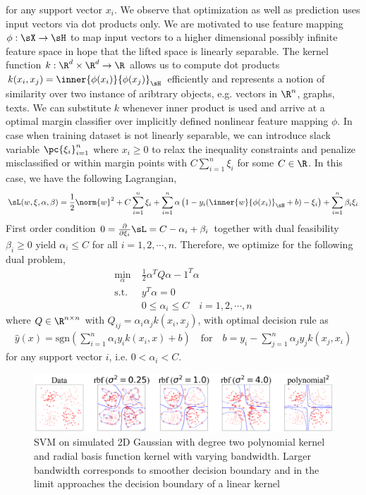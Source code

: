 \documentclass[11pt]{article}
\begin{document}
for any support vector $x_i$. We observe that optimization as well as prediction uses input vectors via dot products only. We are motivated to use feature mapping $\phi:\sX\to\sH$ to map input vectors to a higher dimensional possibly infinite feature space in hope that the lifted space is linearly separable. The kernel function $k: \R^d\times\R^d \to \R$ allows us to compute dot products $k(x_i,x_j)=\inner{\phi(x_i)}{\phi(x_j)}_{\sH}$ efficiently and represents a notion of similarity over two instance of aribtrary objects, e.g. vectors in $\R^n$, graphs, texts. We can substitute $k$ whenever inner product is used and arrive at a optimal margin classifier over implicitly defined nonlinear feature mapping $\phi$. In case when training dataset is not linearly separable, we can introduce slack variable $\pc{\xi_i}_{i=1}^n$ where $x_i\geq 0$ to relax the inequality constraints and penalize misclassified or within margin points with $C\sum_{i=1}^n \xi_i$ for some $C\in\R$. In this case, we have the following Lagrangian,
\begin{align}
    \sL(w,\xi,\alpha,\beta)
        = \frac{1}{2}\norm{w}^2 + C\sum_{i=1}^n \xi_i + \sum_{i=1}^n \alpha \left( 1-y_i ( \inner{w}{\phi(x_i)}_{\sH} + b )-\xi_i \right) + \sum_{i=1}^n \beta_i \xi_i
\end{align}
First order condition $0 = \frac{\partial}{\partial \xi_i}\sL = C - \alpha_i + \beta_i$ together with dual feasibility $\beta_i\geq 0$ yield $\alpha_i \leq C$ for all $i=1,2,\cdots,n$. Therefore, we optimize for the following dual problem,
\begin{align*}
    \min_{\alpha}
        \;& \frac{1}{2} \alpha^T Q \alpha - 1^T \alpha  \\
    \text{s.t.}
    \;& y^T\alpha = 0 \\
    \;& 0\leq \alpha_i \leq C \quad i=1,2,\cdots, n
\end{align*}
where $Q \in \R^{n\times n}$ with $Q_{ij} = \alpha_i \alpha_j k(x_i,x_j)$,
with optimal decision rule as
\begin{align}
    \hat{y}(x) = \text{sgn}\left(
        \sum_{i=1}^n \alpha_i y_i k(x_i,x) + b
    \right)
    \quad\text{for}\quad
    b = y_i - \sum_{j=1}^n \alpha_j y_j k(x_j,x_i)
\end{align}
for any support vector $i$, i.e. $0 < \alpha_i < C$.

\begin{center} 
\begin{figure}[h!]
    \includegraphics[width=\textwidth]{assets/svm_on_2d_gaussian_vary_kernel.png} 
    \caption{SVM on simulated 2D Gaussian with degree two polynomial kernel and radial basis function kernel with varying bandwidth. Larger bandwidth corresponds to smoother decision boundary and in the limit approaches the decision boundary of a linear kernel}
\end{figure}
\end{center} 
 
\end{document}
